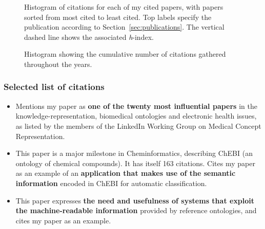 \begin{figure}[H]
    \centering
    
    
    
    \caption{Histogram of citations for each of my cited papers, with papers sorted from most cited to least cited. Top labels specify the publication according to Section~\ref{sec:publications}. The vertical dashed line shows the associated \textit{h}-index.}
    \label{fig:histogram-h-index}
\end{figure}

\begin{figure}[H]
    \centering
    
    
    
    \caption{Histogram showing the cumulative number of citations gathered throughout the years.}
    \label{fig:histogram-citations}
\end{figure}


\subsubsection{Selected list of citations}

\begin{refsection}
\end{refsection}
\begin{itemize}
    \item Mentions my paper \autocite{Ferreira2012a} as \textbf{one of the twenty most influential papers} in the knowledge-representation, biomedical ontologies and electronic health issues, as listed by the members of the LinkedIn Working Group on Medical Concept Representation.
\end{itemize}

\begin{refsection}
\end{refsection}
\begin{itemize}
    \item This paper is a major milestone in Cheminformatics, describing ChEBI (an ontology of chemical compounds). It has itself 163 citations. Cites my paper \autocite{Ferreira2010} as an example of an \textbf{application that makes use of the semantic information} encoded in ChEBI for automatic classification.
\end{itemize}

\begin{refsection}
\end{refsection}
\begin{itemize}
    \item This paper expresses \textbf{the need and usefulness of systems that exploit the machine-readable information} provided by reference ontologies, and cites my paper \autocite{Ferreira2010} as an example.
\end{itemize}

